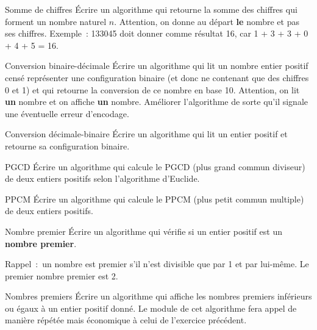 \begin{Exercice}{Somme de chiffres}
	Écrire un algorithme qui retourne la somme des chiffres qui forment un
	nombre naturel $n$. Attention, on donne au départ \textbf{le} nombre et
	pas ses chiffres. Exemple~: 133045 doit donner comme résultat 16,
	car 1 + 3 + 3 + 0 + 4 + 5 = 16.
\end{Exercice}

\begin{Exercice}{Conversion binaire-décimale}
	Écrire un algorithme qui lit un nombre entier positif censé représenter
	une configuration binaire (et donc ne contenant que des chiffres 0 et
	1) et qui retourne la conversion de ce nombre en base 10. Attention, on
	lit \textbf{un} nombre et on affiche \textbf{un} nombre. Améliorer
	l’algorithme de sorte qu’il signale une éventuelle erreur d’encodage.
\end{Exercice}

\begin{Exercice}{Conversion décimale-binaire}
	Écrire un algorithme qui lit un entier positif et retourne sa
	configuration binaire.
\end{Exercice}

\begin{Exercice}{PGCD}
	Écrire un algorithme qui calcule le PGCD (plus grand commun diviseur) de
	deux entiers positifs selon l’algorithme d’Euclide.
\end{Exercice}

\begin{Exercice}{PPCM}
	Écrire un algorithme qui calcule le PPCM (plus petit commun multiple) de
	deux entiers positifs.
\end{Exercice}

\begin{Exercice}{Nombre premier}
	Écrire un algorithme qui vérifie si un entier positif est un
	\textbf{nombre premier}. 
	
	Rappel~:~un nombre est premier s’il n’est divisible que par 1 et par
	lui-même. Le premier nombre premier est 2.
\end{Exercice}

\bigskip
\begin{Exercice}{Nombres premiers}
	Écrire un algorithme qui affiche les nombres premiers inférieurs ou
	égaux à un entier positif donné. Le module de cet algorithme fera appel
	de manière répétée mais économique à celui de l’exercice précédent.
\end{Exercice}

